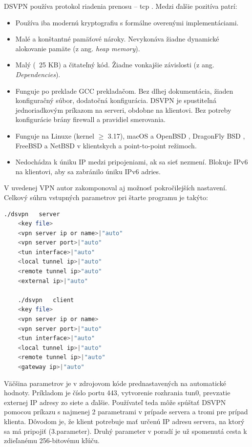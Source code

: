 DSVPN používa protokol riadenia prenosu -- \acrshort{tcp} \cite{tcp}. Medzi ďalšie pozitíva patrí:
\begin{itemize}
	\item{Používa iba modernú kryptografiu s formálne overenými implementáciami.}
	\item{Malé a konštantné pamäťové nároky. Nevykonáva žiadne dynamické alokovanie pamäte (z ang. \textit{heap memory}).}
	\item{Malý (~25 KB) a čitateľný kód. Žiadne vonkajšie závislosti (z ang. \textit{Dependencies}).}
	\item{Funguje po preklade GCC prekladačom. Bez dlhej dokumentácia, žiaden konfiguračný súbor, dodatočná konfigurácia. DSVPN je spustiteľná jednoriadkovým príkazom na serveri, obdobne na klientovi. Bez potreby konfigurácie brány firewall a pravidiel smerovania.}
	\item{Funguje na Linuxe (kernel $\geq$ 3.17), macOS \cite{mac} a OpenBSD \cite{obsd}, DragonFly BSD \cite{dfbsd}, FreeBSD \cite{fbsd} a NetBSD \cite{netbsd} v klientskych a point-to-point režimoch.}
	\item{Nedochádza k úniku IP medzi pripojeniami, ak sa sieť nezmení. Blokuje IPv6 na klientovi, aby sa zabránilo úniku IPv6 adries.}
\end{itemize} 

V uvedenej VPN autor zakomponoval aj možnosť pokročilejších nastavení. Celkový súhrn vstupných parametrov pri štarte programu je takýto:
\begin{lstlisting}[language=bash]
	./dsvpn   server
	<key file>
	<vpn server ip or name>|"auto"
	<vpn server port>|"auto"
	<tun interface>|"auto"
	<local tunnel ip>|"auto"
	<remote tunnel ip>"auto"
	<external ip>|"auto"

	./dsvpn   client
	<key file>
	<vpn server ip or name>
	<vpn server port>|"auto"
	<tun interface>|"auto"
	<local tunnel ip>|"auto"
	<remote tunnel ip>|"auto"
	<gateway ip>|"auto"
	\end{lstlisting} 
Väčšina parametrov je v zdrojovom kóde prednastavených na automatické hodnoty. Príkladom je číslo portu 443, vytvorenie rozhrania tun0, prevzatie externej IP adresy zo siete a ďalšie. Používateľ teda môže spúštať DSVPN pomocou príkazu s najmenej 2 parametrami v prípade servera a tromi pre prípad klienta. Dôvodom je, že klient potrebuje mať určenú IP adresu servera, na ktorý sa má pripojiť (3.parameter). Druhý parameter v poradí je už spomenutá cesta k zdieľanému 256-bitovému kľúču.   

